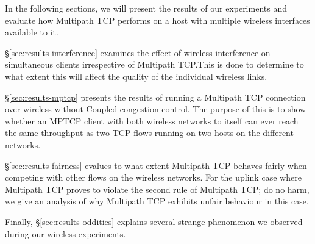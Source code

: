 In the following sections, we will present the results of our experiments and
evaluate how Multipath TCP performs on a host with multiple wireless
interfaces available to it.

\S\ref{sec:results-interference} examines the effect of wireless
interference on simultaneous clients irrespective of Multipath TCP.\@ This is
done to determine to what extent this will affect the quality of the individual
wireless links.

\S\ref{sec:results-mptcp} presents the results of running a Multipath TCP
connection over wireless without Coupled congestion control. The purpose of this
is to show whether an MPTCP client with both wireless networks to itself can
ever reach the same throughput as two TCP flows running on two hosts on
the different networks.

\S\ref{sec:results-fairness} evalues to what extent Multipath TCP behaves
fairly when competing with other flows on the wireless networks. For the uplink
case where Multipath TCP proves to violate the second rule of Multipath TCP; do
no harm, we give an analysis of why Multipath TCP exhibits unfair behaviour in
this case.

Finally, \S\ref{sec:results-oddities} explains several strange phenomenon
we observed during our wireless experiments.
